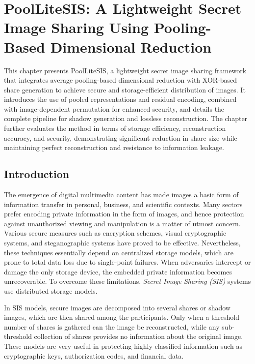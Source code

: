 \chapter{PoolLiteSIS: A Lightweight Secret Image Sharing Using Pooling-Based Dimensional Reduction}

This chapter presents PoolLiteSIS, a lightweight secret image sharing framework that integrates average pooling-based dimensional reduction with XOR-based share generation to achieve secure and storage-efficient distribution of images. It introduces the use of pooled representations and residual encoding, combined with image-dependent permutation for enhanced security, and details the complete pipeline for shadow generation and lossless reconstruction. The chapter further evaluates the method in terms of storage efficiency, reconstruction accuracy, and security, demonstrating significant reduction in share size while maintaining perfect reconstruction and resistance to information leakage.
\section{Introduction}

The emergence of digital multimedia content has made images a basic form of information transfer in personal, business, and scientific contexts. Many sectors prefer encoding private information in the form of images, and hence protection against unauthorized viewing and manipulation is a matter of utmost concern. Various secure measures such as encryption schemes, visual cryptographic systems, and steganographic systems have proved to be effective. Nevertheless, these techniques essentially depend on centralized storage models, which are prone to total data loss due to single-point failures. When adversaries intercept or damage the only storage device, the embedded private information becomes unrecoverable. To overcome these limitations, \textit{Secret Image Sharing (SIS)} systems use distributed storage models.

In SIS models, secure images are decomposed into several shares or shadow images, which are then shared among the participants. Only when a threshold number of shares is gathered can the image be reconstructed, while any sub-threshold collection of shares provides no information about the original image. These models are very useful in protecting highly classified information such as cryptographic keys, authorization codes, and financial data.

